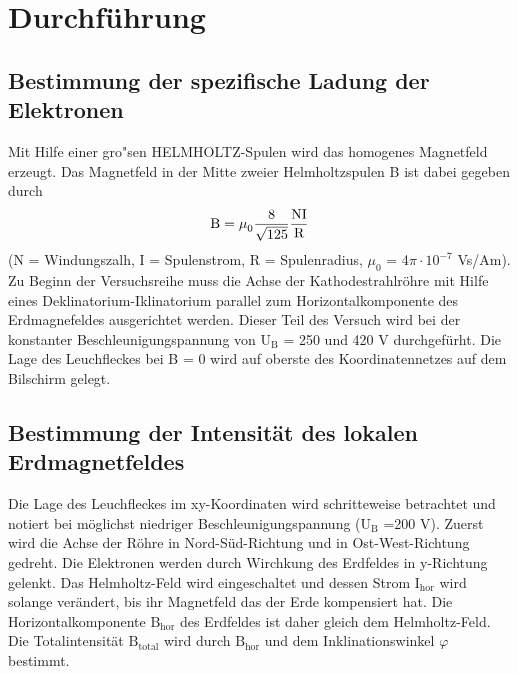 \section{Durchführung}
\subsection{Bestimmung der spezifische Ladung der Elektronen}
Mit Hilfe einer gro"sen HELMHOLTZ-Spulen wird das homogenes Magnetfeld erzeugt.
Das Magnetfeld in der Mitte zweier Helmholtzspulen B ist dabei gegeben durch
\begin{equation}
    \text{B}= \text{$\mu$}_0 \frac{8}{\sqrt{125}} \frac{\text{NI}}{\text{R}}\\
\end{equation}
\noindent(N = Windungszalh, I = Spulenstrom, R = Spulenradius, $\mu_0$ = 4$\pi\cdot 10^{-7}$ Vs/Am).\cite{AL}\\
\noindent
Zu Beginn der Versuchsreihe muss die Achse der Kathodestrahlröhre mit Hilfe eines Deklinatorium-Iklinatorium parallel zum Horizontalkomponente des Erdmagnefeldes ausgerichtet werden.
Dieser Teil des Versuch wird bei der konstanter Beschleunigungspannung von $\text{U}_\text{B}$ = 250 und 420 V durchgefürht. 
Die Lage des Leuchfleckes bei B = 0 wird auf oberste des Koordinatennetzes auf dem Bilschirm gelegt.
\subsection{ Bestimmung der Intensität des lokalen Erdmagnetfeldes}
Die Lage des Leuchfleckes im xy-Koordinaten wird  schritteweise betrachtet und notiert bei möglichst niedriger Beschleunigungspannung ($\text{U}_\text{B}$ =200 V).
Zuerst wird die Achse der Röhre in Nord-Süd-Richtung und in Ost-West-Richtung gedreht. 
Die Elektronen werden durch Wirchkung des Erdfeldes in y-Richtung gelenkt.
 Das Helmholtz-Feld wird eingeschaltet und dessen Strom $\text{I}_{\text{hor}}$ wird solange verändert, bis ihr Magnetfeld das der Erde kompensiert hat.
Die Horizontalkomponente $\text{B}_{\text{hor}}$ des Erdfeldes ist daher gleich dem Helmholtz-Feld.
Die Totalintensität $\text{B}_{\text{total}}$ wird durch $\text{B}_{\text{hor}}$ und dem Inklinationswinkel $\varphi$ bestimmt.


\label{sec:Durchführung}

